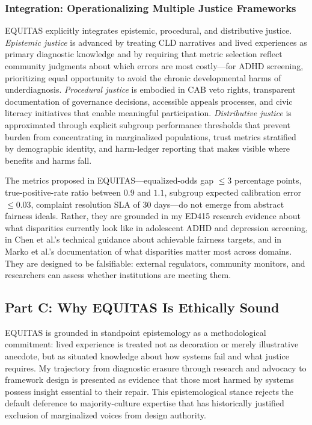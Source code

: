 \documentclass[12pt,letterpaper]{article}
\begin{document}
\subsubsection{Integration: Operationalizing Multiple Justice Frameworks}

EQUITAS explicitly integrates epistemic, procedural, and distributive justice. \textit{Epistemic justice} is advanced by treating CLD narratives and lived experiences as primary diagnostic knowledge and by requiring that metric selection reflect community judgments about which errors are most costly---for ADHD screening, prioritizing equal opportunity to avoid the chronic developmental harms of underdiagnosis.\cite{garcia_ed415} \textit{Procedural justice} is embodied in CAB veto rights, transparent documentation of governance decisions, accessible appeals processes, and civic literacy initiatives that enable meaningful participation.\cite{nadarzynski2024} \textit{Distributive justice} is approximated through explicit subgroup performance thresholds that prevent burden from concentrating in marginalized populations, trust metrics stratified by demographic identity, and harm-ledger reporting that makes visible where benefits and harms fall.\cite{sagona2025}

The metrics proposed in EQUITAS---equalized-odds gap $\leq 3$ percentage points, true-positive-rate ratio between $0.9$ and $1.1$, subgroup expected calibration error $\leq 0.03$, complaint resolution SLA of 30 days---do not emerge from abstract fairness ideals. Rather, they are grounded in my ED415 research evidence about what disparities currently look like in adolescent ADHD and depression screening, in Chen et al.'s technical guidance about achievable fairness targets, and in Marko et al.'s documentation of what disparities matter most across domains.\cite{garcia_ed415}\cite{chen2023}\cite{marko2025} They are designed to be falsifiable: external regulators, community monitors, and researchers can assess whether institutions are meeting them.

\subsection{Part C: Why EQUITAS Is Ethically Sound}

EQUITAS is grounded in standpoint epistemology as a methodological commitment: lived experience is treated not as decoration or merely illustrative anecdote, but as situated knowledge about how systems fail and what justice requires.\cite{garcia_ed415} My trajectory from diagnostic erasure through research and advocacy to framework design is presented as evidence that those most harmed by systems possess insight essential to their repair. This epistemological stance rejects the default deference to majority-culture expertise that has historically justified exclusion of marginalized voices from design authority.\cite{nadarzynski2024}
\end{document}
